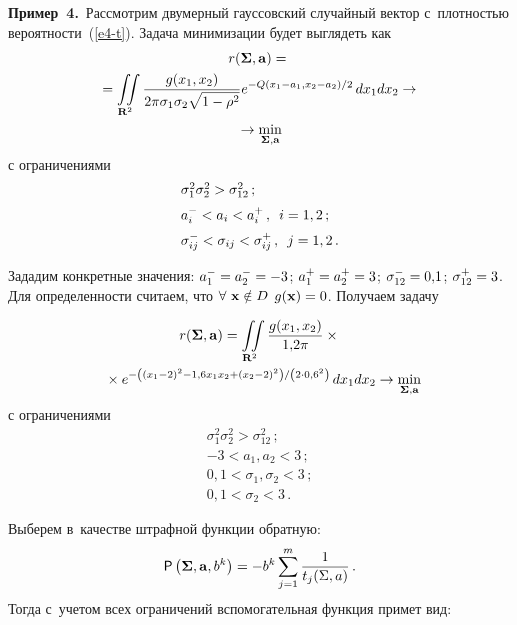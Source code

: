   
  \begin{multicols}{2}
  
  \noindent
  \textbf{Пример~4.}\ Рас\-смот\-рим двумерный гауссовский случайный век\-тор 
с~плот\-ностью ве\-ро\-ят\-ности~(\ref{e4-t}). Задача минимизации будет выглядеть 
как
\begin{multline*}
  r(\boldsymbol{\Sigma}, \mathbf{a})={}\\
  {}=\iint\limits_{\mathbf{R}^2} 
   \fr{g(x_1, x_2)}{2\pi \sigma_1\sigma_2 \sqrt{1-\rho^2}} %
e^{-Q(x_1-a_1, x_2-
a_2)/2} \,dx_1 dx_2 \to {}\\
{}\to \min\limits_{\boldsymbol{\Sigma}, \mathbf{a}}
\end{multline*}
с ограничениями
\begin{equation*}
\begin{array}{l}
\sigma_1^2\sigma_2^2> \sigma_{12}^2\,;\\[6pt]
a_i^- <a_i< a_i^+\,,\enskip i=1,2\,;\\[6pt]
\sigma_{ij}^-<\sigma_{ij}<\sigma_{ij}^+\,,\enskip j=1,2\,.
\end{array}
\end{equation*}
  
  Зададим конкретные значения: $a_1^-\hm=a_2^- \hm=-3$; $a_1^+\hm= a_2^+ 
\hm=3$; $\sigma_{12}^- \hm= 0{,}1$; $\sigma_{12}^+\hm=3$. Для 
опре\-де\-лен\-ности считаем, что $\forall\ \mathbf{x}\hm\notin D$ 
$g(\mathbf{x})\hm=0$. Получаем задачу

\noindent
  \begin{multline*}
  r(\boldsymbol{\Sigma}, \mathbf{a})= \iint\limits_{\mathbf{R}^2} 
\displaystyle\frac{\displaystyle   g(x_1, x_2)\mathstrut}{\displaystyle 1{,}2\pi\mathstrut}\times{}\\
\!{}\times e^{-\left((x_1-2)^2-1{,}6x_1 x_2+(x_2-2)^2\right)/\left(2\cdot 0{,}6^2\right)}\, 
dx_1 dx_2\to \min\limits_{\boldsymbol{\Sigma}, \mathbf{a}}\hspace*{-5.74925pt}
\end{multline*}
с ограничениями
\begin{equation*}
\begin{array}{l}
\sigma_1^2\sigma_2^2>\sigma_{12}^2\,;\\[6pt]
-3<a_1, a_2<3\,;\\[6pt]
0{,}1<\sigma_1, \sigma_2<3\,;\\[6pt]
0{,}1< \sigma_2<3\,.
\end{array}
\end{equation*}
  
    
    Выберем в~качестве штрафной функ\-ции обратную: 
    $$
    {\sf P}\left(\boldsymbol{\Sigma},\mathbf{a}, b^k\right) =-b^k \sum\limits^m_{j=1} 
\displaystyle\frac{\displaystyle 1\mathstrut}{\displaystyle t_j(\Sigma, a)\mathstrut}\,.
$$
    Тогда с~учетом всех ограничений вспомогательная функ\-ция примет вид:
    

\end{multicols}
